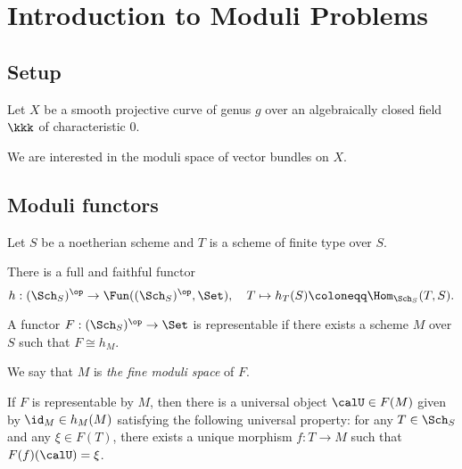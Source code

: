 \section{Introduction to Moduli Problems}

\subsection{Setup}

    Let \(X\) be a smooth projective curve of genus \(g\) over an algebraically closed field \(\kkk\) of characteristic \(0\).

    We are interested in the moduli space of vector bundles on \(X\).

\subsection{Moduli functors}

    Let \(S\) be a noetherian scheme and \(T\) is a scheme of finite type over \(S\).

    \begin{theorem}\label{thm:yoneda_lemma}
        There is a full and faithful functor 
        \[ h : (\Sch_S)^{\op} \to \Fun((\Sch_S)^{\op}, \Set), \quad T \mapsto h_T(S) \coloneqq \Hom_{\Sch_S}(T, S). \]
    \end{theorem}

    \begin{definition}\label{def:representable_functor}
        A functor \(F : (\Sch_S)^{\op} \to \Set\) is representable if there exists a scheme \(M\) over \(S\) such that \(F \cong h_M\).
    \end{definition}

    We say that \(M\) is \emph{the fine moduli space} of \(F\).

    \begin{remark}\label{rmk:fine_moduli_space}
        If \(F\) is representable by \(M\), then there is a universal object \(\calU \in F(M)\) given by \(\id_M \in h_M(M)\) satisfying the following universal property: 
        for any \(T \in \Sch_S\) and any \(\xi \in F(T)\), there exists a unique morphism \(f : T \to M\) such that \(F(f)(\calU) = \xi\).
    \end{remark}

